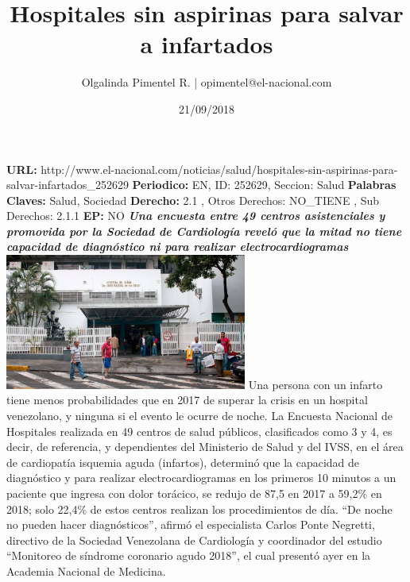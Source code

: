 \documentclass{article}%
\title{\textbf{Hospitales sin aspirinas para salvar a infartados}}%
\author{Olgalinda Pimentel R. | opimentel@el{-}nacional.com}%
\date{21/09/2018}%
\begin{document}
%
\normalsize%
\maketitle%
\textbf{URL: }%
http://www.el{-}nacional.com/noticias/salud/hospitales{-}sin{-}aspirinas{-}para{-}salvar{-}infartados\_252629\newline%
%
\textbf{Periodico: }%
EN, %
ID: %
252629, %
Seccion: %
Salud\newline%
%
\textbf{Palabras Claves: }%
Salud, Sociedad\newline%
%
\textbf{Derecho: }%
2.1%
, Otros Derechos: %
NO\_TIENE%
, Sub Derechos: %
2.1.1%
\newline%
%
\textbf{EP: }%
NO\newline%
\newline%
%
\textbf{\textit{Una encuesta entre 49 centros asistenciales y promovida por la Sociedad de Cardiología reveló que la mitad no tiene capacidad de diagnóstico ni para realizar electrocardiogramas}}%
\newline%
\newline%
%
\includegraphics[width=300px]{239.jpg}%
\newline%
%
Una persona con un infarto tiene menos probabilidades que en 2017 de superar la crisis en un hospital venezolano, y ninguna si el evento le ocurre de noche.%
\newline%
%
La Encuesta Nacional de Hospitales realizada en 49 centros de salud públicos, clasificados como 3 y 4, es decir, de referencia, y dependientes del Ministerio de Salud y del IVSS, en el área de cardiopatía isquemia aguda (infartos), determinó que la capacidad de diagnóstico y para realizar electrocardiogramas en los primeros 10 minutos a un paciente que ingresa con dolor torácico, se redujo de 87,5 en 2017 a 59,2\% en 2018; solo 22,4\% de estos centros realizan los procedimientos de día. “De noche no pueden hacer diagnósticos”, afirmó el especialista Carlos Ponte Negretti, directivo de la Sociedad Venezolana de Cardiología y coordinador del estudio “Monitoreo de síndrome coronario agudo 2018”, el cual presentó ayer en la Academia Nacional de Medicina.%
\end{document}
